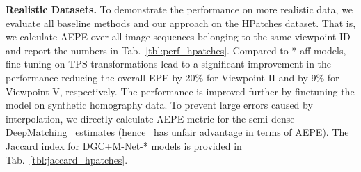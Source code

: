 \documentclass[10pt,twocolumn,letterpaper]{article}
\begin{document}
\begin{table}[t!]
\begin{center}
\end{center}
\caption{AEPE metric on the data from~\cite{Rocco17}. For DGC-Net+M models, the Jaccard index is also  reported.}\label{tbl:perf_rocco}
\vspace{-2mm}
\end{table}


\noindent\textbf{Realistic Datasets.} To demonstrate the performance on more realistic data, we evaluate all baseline methods and our approach on the HPatches dataset. That is, we calculate AEPE over all image sequences belonging to the same viewpoint ID and report the numbers in Tab.~\ref{tbl:perf_hpatches}. Compared to *-aff models, fine-tuning on TPS transformations lead to a significant improvement in the performance reducing the overall EPE by 20\% for Viewpoint II and by 9\% for Viewpoint V, respectively. The performance is improved further by finetuning the model on synthetic homography data. To prevent large errors caused by interpolation, we directly calculate AEPE metric for the semi-dense DeepMatching~\cite{DeepMatching} estimates (\ie hence~\cite{DeepMatching} has unfair advantage in terms of AEPE).
The Jaccard index for DGC+M-Net-* models is provided in Tab.~\ref{tbl:jaccard_hpatches}.
\end{document}
